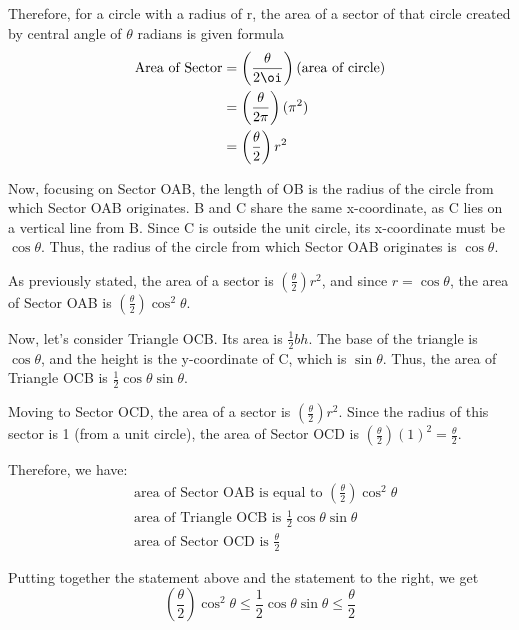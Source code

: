 \documentclass{article}
\begin{document}
\hspace{1em}


Therefore, for a circle with a radius of r, the area of a sector of that circle created by central angle of $\theta$ radians is given formula \\

\begin{align*}
    \text{Area of Sector} &= \left(\frac{\theta}{2 \oi}\right )(\text{area of circle})\\
    &=\left(\frac{\theta}{2 \pi}\right)(\pi ^2)\\
    &=\left(\frac{\theta}{2}\right)r^2
\end{align*}


Now, focusing on Sector OAB, the length of OB is the radius of the circle from which Sector OAB originates. B and C share the same x-coordinate, as C lies on a vertical line from B. Since C is outside the unit circle, its x-coordinate must be $\cos \theta$. Thus, the radius of the circle from which Sector OAB originates is $\cos \theta$.

As previously stated, the area of a sector is $\left(\frac{\theta}{2}\right)r^2$, and since $r=\cos \theta$, the area of Sector OAB is $\left(\frac{\theta}{2}\right)\cos^2\theta$.

Now, let’s consider Triangle OCB. Its area is $\frac{1}{2}bh$. The base of the triangle is $\cos \theta$, and the height is the y-coordinate of C, which is $\sin \theta$. Thus, the area of Triangle OCB is $\frac{1}{2}\cos \theta \sin \theta$.

Moving to Sector OCD, the area of a sector is $\left(\frac{\theta}{2}\right)r^2$. Since the radius of this sector is 1 (from a unit circle), the area of Sector OCD is $\left(\frac{\theta}{2}\right)(1)^2 = \frac{\theta}{2}$.

Therefore, we have:
\begin{align*}
    &\text{area of Sector OAB is equal to } \left(\frac{\theta}{2} \right)\cos^2\theta\\
    &\text{area of Triangle OCB is } \frac{1}{2}\cos \theta \sin \theta \\
    &\text{area of Sector OCD is } \frac{\theta}{2}
\end{align*}


Putting together the statement above and the statement to the right, we get
\begin{equation*}
    \left(\frac{\theta}{2} \right)\cos^2\theta \leq \frac{1}{2}\cos \theta \sin \theta \leq \frac{\theta}{2}
\end{equation*}
\end{document}

